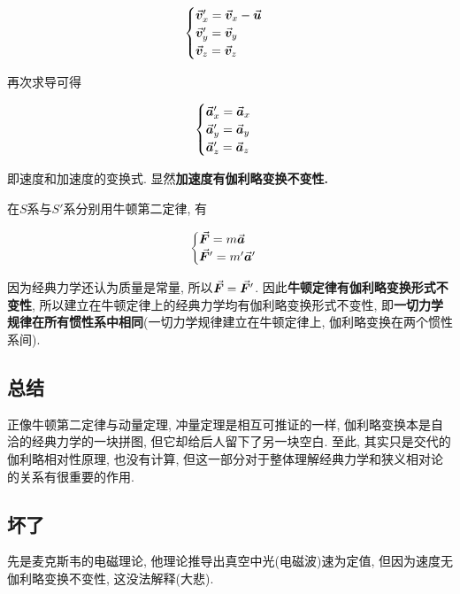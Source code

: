 \begin{equation}
	\begin{cases}
		\va*{v}'_x = \va*{v}_x - \va*{u} \\
		\va*{v}'_y = \va*{v}_y \\
		\va*{v}_z = \va*{v}_z
	\end{cases}
    \label{C6-eq4}
\end{equation}

再次求导可得

\begin{equation}
	\begin{cases}
		\va*{a}'_x = \va*{a}_x \\
		\va*{a}'_y = \va*{a}_y \\
		\va*{a}'_z = \va*{a}_z
	\end{cases}
    \label{C6-eq5}
\end{equation}

即速度和加速度的变换式. 显然\textbf{加速度有伽利略变换不变性. }

在$S$系与$S'$系分别用牛顿第二定律, 有

\begin{equation}
	\begin{cases}
		\va*{F} = m \va*{a} \\
		\va*{F}' = m' \va*{a}' 
	\end{cases}
    \label{C6-eq6}
\end{equation}

因为经典力学还认为质量是常量, 所以$\va*{F} = \va*{F}'$. 因此\textbf{牛顿定律有伽利略变换形式不变性}, 所以建立在牛顿定律上的经典力学均有伽利略变换形式不变性, 即\textbf{一切力学规律在所有惯性系中相同}(一切力学规律建立在牛顿定律上, 伽利略变换在两个惯性系间). 

\subsection{总结}

正像牛顿第二定律与动量定理, 冲量定理是相互可推证的一样, 伽利略变换本是自洽的经典力学的一块拼图, 但它却给后人留下了另一块空白. 至此, 其实只是交代的伽利略相对性原理, 也没有计算, 但这一部分对于整体理解经典力学和狭义相对论的关系有很重要的作用. 

\subsection{坏了}

先是麦克斯韦的电磁理论, 他理论推导出真空中光(电磁波)速为定值, 但因为速度无伽利略变换不变性, 这没法解释(大悲). 

